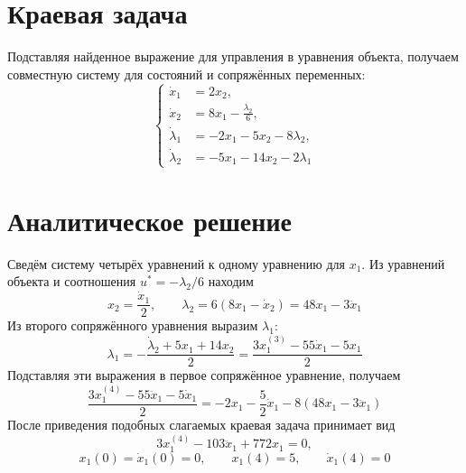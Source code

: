 \section{Краевая задача}

Подставляя найденное выражение для управления в уравнения объекта,
получаем совместную систему для состояний и сопряжённых переменных:
\[
\begin{cases}
    \dot x_1&=2x_2,\\
\dot x_2&=8x_1-\frac{\lambda_2}{6},\\
\dot\lambda_1&=-2x_1-5x_2-8\lambda_2,\\
\dot\lambda_2&=-5x_1-14x_2-2\lambda_1
\end{cases}
\]

\section{Аналитическое решение}

Сведём систему четырёх уравнений к одному уравнению для $x_1$.
Из уравнений объекта и соотношения $u^*=-\lambda_2/6$ находим
\[
 x_2=\frac{\dot x_1}{2},
\qquad
\lambda_2=6(8x_1-\dot x_2)=48x_1-3\ddot x_1
\]
Из второго сопряжённого уравнения выразим $\lambda_1$:
\[
\lambda_1=-\frac{\dot\lambda_2+5x_1+14x_2}{2}
=\frac{3x_1^{(3)}-55\dot x_1-5x_1}{2}
\]
Подставляя эти выражения в первое сопряжённое уравнение, получаем
\[
\frac{3x_1^{(4)}-55\ddot x_1-5\dot x_1}{2}
=-2x_1-\frac52\dot x_1-8(48x_1-3\ddot x_1)
\]
После приведения подобных слагаемых краевая задача принимает вид
\[
3x_1^{(4)}-103\ddot x_1+772x_1=0,
\]
\[
x_1(0)=\dot x_1(0)=0,
\qquad x_1(4)=5,\qquad \dot x_1(4)=0
\]


